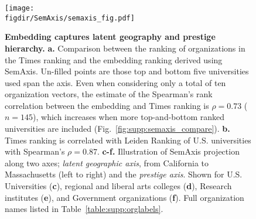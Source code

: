 \documentclass[12pt]{article} %
\def\figdir{../Figs}
\begin{document}
%
%
\begin{figure}[hp!]
	\centering
	\texttt{[image: \\figdir/SemAxis/semaxis\_fig.pdf]}
	\caption{
		\textbf{Embedding captures latent geography and prestige hierarchy.}
		\textbf{a.} Comparison between the ranking of organizations in the Times ranking and the embedding ranking derived using SemAxis.
		Un-filled points are those top and bottom five universities used span the axis.
	  	Even when considering only a total of ten organization vectors, the estimate of the Spearman's rank correlation between the embedding and Times ranking is $\rho = 0.73$ ($n = 145$), which increases when more top-and-bottom ranked universities are included (Fig.~\ref{fig:supp:semaxis_compare}).
	  	\textbf{b.} Times ranking is correlated with Leiden Ranking of U.S. universities with Spearman's $\rho = 0.87$.
		\textbf{c-f.} Illustration of SemAxis projection along two axes;  \textit{latent geographic axis}, from California to Massachusetts (left to right) and the \textit{prestige axis}.
		Shown for U.S. Universities (\textbf{c}), regional and liberal arts colleges (\textbf{d}), Research institutes (\textbf{e}), and Government organizations (\textbf{f}).
		Full organization names listed in Table~\ref{table:supp:orglabels}.
	}
	\label{fig:semaxis}
\end{figure}
\end{document}
